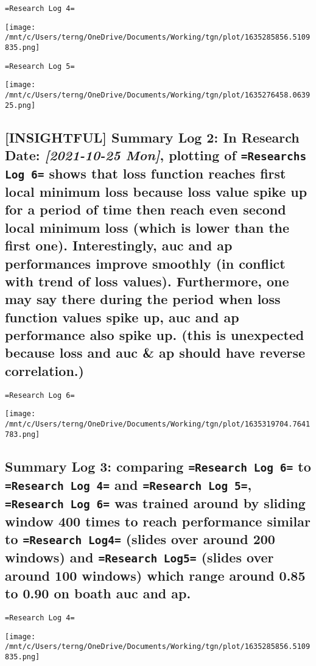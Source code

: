 \documentclass[11pt]{article}
\begin{document}
\texttt{=Research Log 4=}
\begin{center}
\texttt{[image: /mnt/c/Users/terng/OneDrive/Documents/Working/tgn/plot/1635285856.5109835.png]}
\end{center}

\texttt{=Research Log 5=}
\begin{center}
\texttt{[image: /mnt/c/Users/terng/OneDrive/Documents/Working/tgn/plot/1635276458.063925.png]}
\end{center}


\subsection{[INSIGHTFUL] Summary Log 2: In Research Date: \textit{[2021-10-25 Mon]}, plotting of \texttt{=Researchs Log 6=} shows that loss function reaches first local minimum loss because loss value spike up for a period of time then reach even second local minimum loss (which is lower than the first one). Interestingly, auc and ap performances improve smoothly (in conflict with trend of loss values). Furthermore, one may say there during the period when loss function values spike up, auc and ap performance also spike up. (this is unexpected because loss and auc \& ap should have reverse correlation.)}
\label{sec:orga591df5}

\texttt{=Research Log 6=}
\begin{center}
\texttt{[image: /mnt/c/Users/terng/OneDrive/Documents/Working/tgn/plot/1635319704.7641783.png]}
\end{center}



\subsection{Summary Log 3: comparing \texttt{=Research Log 6=} to \texttt{=Research Log 4=} and \texttt{=Research Log 5=}, \texttt{=Research Log 6=} was trained around by sliding window 400 times to reach performance similar to \texttt{=Research Log4=} (slides over around 200 windows) and \texttt{=Research Log5=} (slides over around 100 windows) which range around 0.85 to 0.90 on boath auc and ap.}
\label{sec:orga1fd186}

\texttt{=Research Log 4=}
\begin{center}
\texttt{[image: /mnt/c/Users/terng/OneDrive/Documents/Working/tgn/plot/1635285856.5109835.png]}
\end{center}
\end{document}
